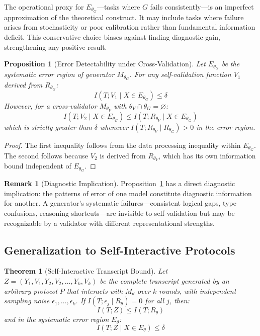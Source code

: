 \documentclass[11pt,a4paper]{article}
\newtheorem{proposition}{Proposition}[section]
\newtheorem{theorem}{Theorem}[section]
\theoremstyle{definition}
\newtheorem{remark}{Remark}[section]
\newcommand{\Rtheta}{R_\theta}
\newcommand{\thetaG}{\theta_G}
\newcommand{\thetaV}{\theta_V}
\begin{document}
The operational proxy for $E_{\thetaG}$---tasks where $G$ fails consistently---is an imperfect approximation of the theoretical construct. It may include tasks where failure arises from stochasticity or poor calibration rather than fundamental information deficit. This conservative choice biases against finding diagnostic gain, strengthening any positive result.

\begin{proposition}[Error Detectability under Cross-Validation]
\label{prop:crossval}
Let $E_{\thetaG}$ be the systematic error region of generator $M_{\thetaG}$. For any self-validation function $V_1$ derived from $R_{\thetaG}$:
\begin{equation}
I(T; V_1 \mid X \in E_{\thetaG}) \leq \delta
\end{equation}
However, for a cross-validator $M_{\thetaV}$ with $\thetaV \cap \thetaG = \varnothing$:
\begin{equation}
I(T; V_2 \mid X \in E_{\thetaG}) \leq I(T; R_{\thetaV} \mid X \in E_{\thetaG})
\end{equation}
which is strictly greater than $\delta$ whenever $I(T; R_{\thetaV} \mid R_{\thetaG}) > 0$ in the error region.
\end{proposition}

\begin{proof}
The first inequality follows from the data processing inequality within $E_{\thetaG}$. The second follows because $V_2$ is derived from $R_{\thetaV}$, which has its own information bound independent of $E_{\thetaG}$.
\end{proof}

\begin{remark}[Diagnostic Implication]
\label{rem:diagnostic}
Proposition~\ref{prop:crossval} has a direct diagnostic implication: the patterns of error of one model constitute diagnostic information for another. A generator's systematic failures---consistent logical gaps, type confusions, reasoning shortcuts---are invisible to self-validation but may be recognizable by a validator with different representational strengths.
\end{remark}


\subsection{Generalization to Self-Interactive Protocols}

\begin{theorem}[Self-Interactive Transcript Bound]
\label{thm:transcript}
Let $Z = (Y_1, V_1, Y_2, V_2, \ldots, Y_k, V_k)$ be the complete transcript generated by an arbitrary protocol $P$ that interacts with $M_\theta$ over $k$ rounds, with independent sampling noise $\epsilon_1, \ldots, \epsilon_k$. If $I(T; \epsilon_j \mid \Rtheta) = 0$ for all $j$, then:
\begin{equation}
I(T; Z) \leq I(T; \Rtheta)
\end{equation}
and in the systematic error region $E_\theta$:
\begin{equation}
I(T; Z \mid X \in E_\theta) \leq \delta
\end{equation}
\end{theorem}
\end{document}
